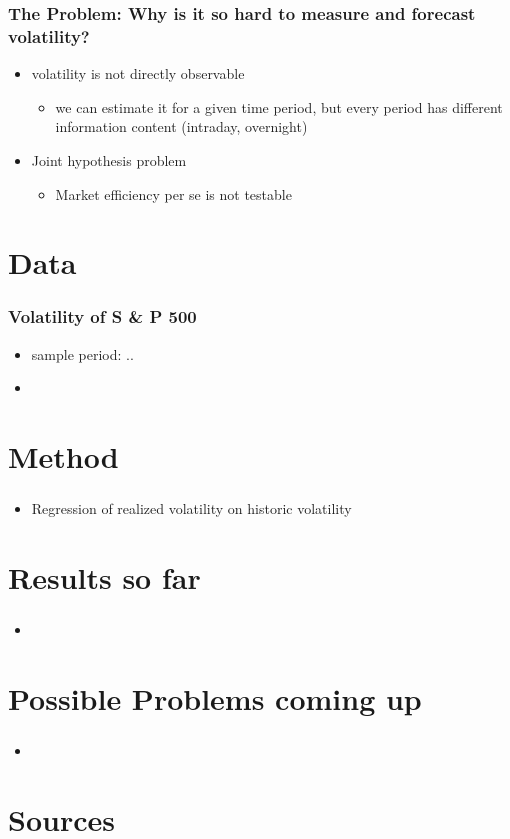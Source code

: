 \documentclass[aspectratio=169]{beamer}
\begin{document}
\begin{frame}
\frametitle{The Problem: Why is it so hard to measure and forecast volatility?}
	\begin{itemize}
	\item<1-> volatility is not directly observable
	\begin{itemize}
	\item<1-> we can estimate it for a given time period, but every period has different information content (intraday, overnight)
	\end{itemize}
	\item<2-> Joint hypothesis problem
	\begin{itemize}
	\item<2-> Market efficiency per se is not testable
	\end{itemize}
	\end{itemize}
\end{frame}

\section{Data}

\begin{frame}
\frametitle{Volatility of S \& P 500}
	\begin{itemize}
	\item sample period: ..
	\item 
	\end{itemize}
\end{frame}


\section{Method}

\begin{frame}
\frametitle{}
	\begin{itemize}
	\item Regression of realized volatility on historic volatility
	\end{itemize}
\end{frame}


\section{Results so far}

\begin{frame}
\frametitle{}
	\begin{itemize}
	\item
	\end{itemize}
\end{frame}


\section{Possible Problems coming up}

\begin{frame}
\frametitle{}
	\begin{itemize}
	\item
	\end{itemize}
\end{frame}

\section*{Sources}
\begin{frame}

\end{frame}
\end{document}

